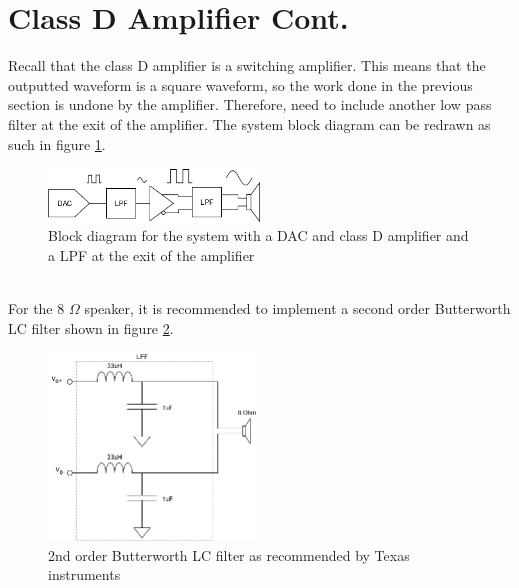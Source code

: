 \documentclass[12pt, a4paper]{article}
\begin{document}
\section{Class D Amplifier Cont.}
Recall that the class D amplifier is a switching amplifier. This means that the outputted waveform is a square waveform, so the work done in the previous section is undone by the amplifier. Therefore, need to include another low pass filter at the exit of the amplifier. The system block diagram can be redrawn as such in figure \ref{fig:SystemPostLPF}.
\begin{figure} [!htb]
	\hfill\includegraphics[width=0.5\textwidth]{./Figures/System_Post_LPF}\hspace{\fill}
	\caption{Block diagram for the system with a DAC and class D amplifier and a LPF at the exit of the amplifier}
	\label{fig:SystemPostLPF}
\end{figure} \\
For the 8 $\Omega$ speaker, it is recommended to implement a second order Butterworth LC filter shown in figure \ref{fig:Speaker_LPF}. 

\begin{figure} [!htb]
	\hfill\includegraphics[width=0.5\textwidth]{./Figures/Speaker_LPF}\hspace{\fill}
	\caption{2nd order Butterworth LC filter as recommended by Texas instruments}
	\label{fig:Speaker_LPF}
\end{figure}
\pagebreak
\end{document}

